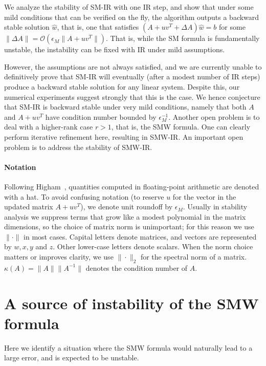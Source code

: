 \documentclass{siamltex}
\newcommand{\eps}{\epsilon}
\begin{document}
We analyze the stability of SM-IR with one IR step, and show that under some mild conditions that can be verified on the fly, the algorithm outputs a backward stable solution $\hat w$, that is, one that satisfies 
$(A+uv^T+\Delta A)\hat w = b$ for some $\|\Delta A\|=\mathcal{O}(\eps_M\|A+uv^T\|)$. 
That is, while the SM formula is fundamentally unstable, the instability can be fixed with IR under mild assumptions. 

However, the assumptions are not always satisfied, and we are currently unable to definitively prove that SM-IR will eventually (after a modest number of IR steps) produce a backward stable solution for any linear system. Despite this, our numerical experiments suggest strongly that this is the case. 
We hence conjecture that SM-IR is backward stable under very mild conditions, namely that both $A$ and $A+uv^T$ have condition number bounded by $\eps_M^{-1}$. 
Another open problem is to deal with a higher-rank case $r>1$, that is, the SMW formula. One can clearly perform iterative refinement here, resulting in SMW-IR. An important open problem is to address the stability of SMW-IR. 

\paragraph{Notation}
Following Higham~\cite{Higham02}, quantities computed in floating-point arithmetic are denoted with a hat.
To avoid confusing notation (to reserve $u$ for the vector in the updated matrix $A+uv^T$), we denote unit roundoff by $\eps_M$. Usually in stability analysis we suppress terms that grow like a modest polynomial in the matrix dimensions, so the choice of matrix norm is unimportant; for this reason we use $\|\cdot\|$ in most cases. 
Capital letters denote matrices, and vectors are represented by $w,x,y$ and $z$. Other lower-case letters denote scalars. When the norm choice matters or improves clarity, we use $\|\cdot\|_2$ for the spectral norm of a matrix. $\kappa(A)=\|A\|\|A^{-1}\|$ denotes the condition number of $A$. 


\section{A source of instability of the SMW formula}\label{sec:source}
Here we identify a situation where the SMW formula would naturally lead to a large error, and is expected to be unstable. 
\end{document}
